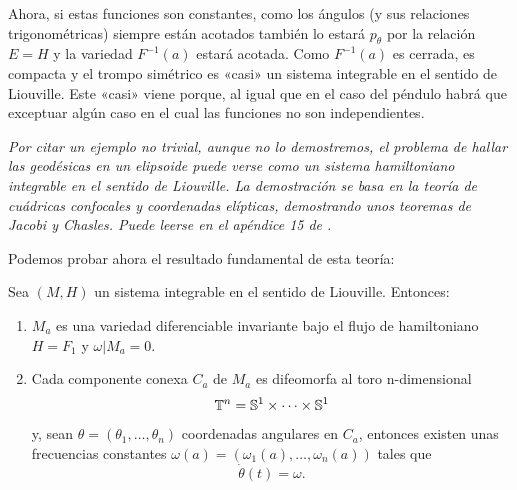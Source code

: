 \begin{ejemplo}
  Ahora, si estas funciones son constantes, como los ángulos (y sus relaciones trigonométricas) siempre están acotados también lo estará $p_{\theta}$ por la relación $E=H$ y la variedad $F^{-1}(a)$ estará acotada. Como $F^{-1}(a)$ es cerrada, es compacta y el trompo simétrico es «casi» un sistema integrable en el sentido de Liouville. Este «casi» viene porque, al igual que en el caso del péndulo habrá que exceptuar algún caso en el cual las funciones no son independientes.
\end{ejemplo}

\begin{ejemplo}
  \em
  Por citar un ejemplo no trivial, aunque no lo demostremos, el problema de hallar las geodésicas en un elipsoide puede verse como un sistema hamiltoniano integrable en el sentido de Liouville. La demostración se basa en la teoría de cuádricas confocales y coordenadas elípticas, demostrando unos teoremas de Jacobi y Chasles. Puede leerse en el apéndice 15 de \cite{arnold}.
\end{ejemplo}

Podemos probar ahora el resultado fundamental de esta teoría:
\begin{thm}[Arnold]
Sea $(M,H)$ un sistema integrable en el sentido de Liouville. Entonces:
\begin{enumerate}
  \item $M_a$ es una variedad diferenciable invariante bajo el flujo de hamiltoniano $H=F_1$ y $\omega|M_a=0$.
  \item Cada componente conexa $C_a$ de $M_a$ es difeomorfa al toro n-dimensional 
    \[
      \mathbb{T}^n=\mathbb{S}^1 \times \cdots \times \mathbb{S}^1
    \]
    y, sean $\theta=(\theta_1,\dots,\theta_n)$ coordenadas angulares en $C_a$, entonces existen unas frecuencias constantes $\omega(a)=(\omega_1(a),\dots,\omega_n(a))$ tales que
    \[
    \dot{\theta}(t)=\omega.
    \]
    
\end{enumerate}

\end{thm}

